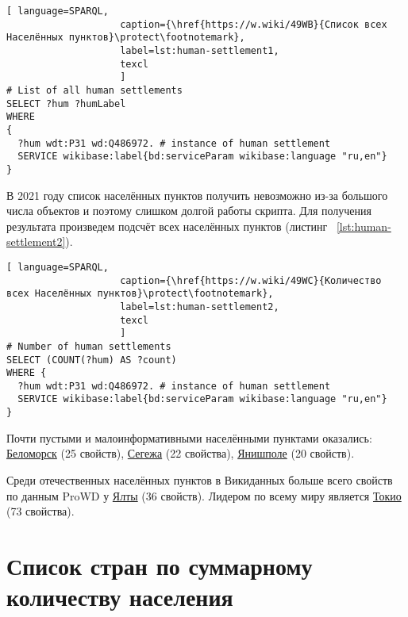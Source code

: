 \begin{lstlisting}[ language=SPARQL, 
                    caption={\href{https://w.wiki/49WB}{Список всех Населённых пунктов}\protect\footnotemark},
                    label=lst:human-settlement1,
                    texcl 
                    ]
# List of all human settlements
SELECT ?hum ?humLabel 
WHERE 
{
  ?hum wdt:P31 wd:Q486972. # instance of human settlement  
  SERVICE wikibase:label{bd:serviceParam wikibase:language "ru,en"}
}
\end{lstlisting}%

В 2021 году список населённых пунктов получить невозможно из-за большого числа объектов и поэтому слишком долгой работы скрипта. Для получения результата произведем подсчёт всех населённых пунктов (листинг ~\protect\ref{lst:human-settlement2}).

\begin{lstlisting}[ language=SPARQL, 
                    caption={\href{https://w.wiki/49WC}{Количество всех Населённых пунктов}\protect\footnotemark},
                    label=lst:human-settlement2,
                    texcl 
                    ]
# Number of human settlements
SELECT (COUNT(?hum) AS ?count) 
WHERE {
  ?hum wdt:P31 wd:Q486972. # instance of human settlement  
  SERVICE wikibase:label{bd:serviceParam wikibase:language "ru,en"}
}
\end{lstlisting}%

Почти пустыми и малоинформативными населёнными пунктами оказались: \href{http://www.wikidata.org/entity/Q31913786}{Беломорск} (\num{25} свойств), \href{http://www.wikidata.org/entity/Q37958167}{Сегежа} (\num{22} свойства), \href{http://www.wikidata.org/entity/Q33522990}{Янишполе} (\num{20} свойств).

Среди отечественных населённых пунктов в Викиданных больше всего свойств по данным ProWD у \href{http://www.wikidata.org/entity/Q128499}{Ялты} (\num{36} свойств). Лидером по всему миру является \href{http://www.wikidata.org/entity/Q1490}{Токио} (\num{73} свойства). \protect\footnotemark



\section{Список стран по суммарному количеству населения}

